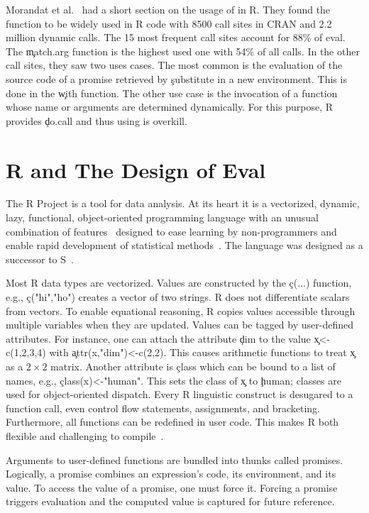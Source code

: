 \documentclass[USenglish,cleveref, autoref, thm-restate]{lipics-v2019}
\begin{document}
Morandat et al.~\cite{ecoop12} had a short section on the usage of \eval in
R. They found the \eval function to be widely used in R code with 8500 call
sites in CRAN and 2.2 million dynamic calls. The 15 most frequent call sites
account for 88\% of eval. The \c{match.arg} function is the highest used one
with 54\% of all calls. In the other call sites, they saw two uses
cases. The most common is the evaluation of the source code of a promise
retrieved by \c{substitute} in a new environment. This is done in the
\c{with} function. The other use case is the invocation of a function whose
name or arguments are determined dynamically. For this purpose, R provides
\c{do.call} and thus using \eval is overkill.

\section{R and The Design of Eval}

The R Project is a tool for data analysis.  At its heart it is a {vectorized,
  dynamic, lazy, functional, object-oriented} programming language with an
unusual combination of features~\cite{ecoop12} designed to ease learning by
non-programmers and enable rapid development of statistical
methods~\cite{R96}.  The language was designed as a successor to
S~\cite{S88}.



Most R data types are vectorized. Values are constructed by the \c{c(...)}
function, e.g., \c{c("hi","ho")} creates a vector of two strings.  R does
not differentiate scalars from vectors. To enable equational reasoning, R
copies values accessible through multiple variables when they are updated.
Values can be tagged by user-defined attributes. For instance, one can
attach the attribute \c{dim} to the value \c{x<-c(1,2,3,4)} with
\c{attr(x,"dim")<-c(2,2)}.  This causes arithmetic functions to treat \c x
as a $2 \times 2$ matrix. Another attribute is \c{class} which can be bound to a list
of names, e.g., \c{class(x)<-"human"}. This sets the class of \c{x} to
\c{human}; classes are used for object-oriented dispatch.  Every R
linguistic construct is desugared to a function call, even control flow
statements, assignments, and bracketing. Furthermore, all functions can be
redefined in user code. This makes R both flexible and challenging to
compile~\cite{dls19}.

Arguments to user-defined functions are bundled into thunks called
promises. Logically, a promise combines an expression's code, its
environment, and its value.  To access the value of a promise, one must
force it. Forcing a promise triggers evaluation and the computed value is
captured for future reference.
\end{document}

